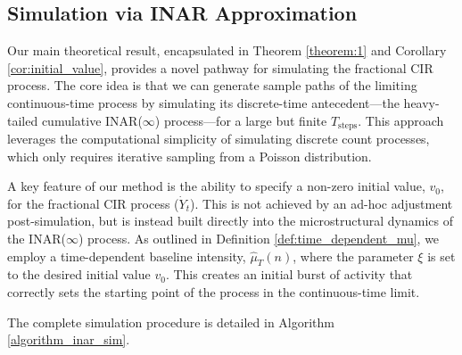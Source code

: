 \documentclass[letterpaper]{article}
\numberwithin{equation}{section}
\theoremstyle{definition}
\theoremstyle{remark}
\begin{document}
\subsection{Simulation via INAR Approximation}
\label{subsec:inar_simulation}

Our main theoretical result, encapsulated in Theorem \ref{theorem:1} and Corollary \ref{cor:initial_value}, provides a novel pathway for simulating the fractional CIR process. The core idea is that we can generate sample paths of the limiting continuous-time process by simulating its discrete-time antecedent---the heavy-tailed cumulative INAR($\infty$) process---for a large but finite $T_{\text{steps}}$. This approach leverages the computational simplicity of simulating discrete count processes, which only requires iterative sampling from a Poisson distribution.

A key feature of our method is the ability to specify a non-zero initial value, $v_0$, for the fractional CIR process ($\dot{Y}_t$). This is not achieved by an ad-hoc adjustment post-simulation, but is instead built directly into the microstructural dynamics of the INAR($\infty$) process. As outlined in Definition \ref{def:time_dependent_mu}, we employ a time-dependent baseline intensity, $\hat{\mu}_T(n)$, where the parameter $\xi$ is set to the desired initial value $v_0$. This creates an initial burst of activity that correctly sets the starting point of the process in the continuous-time limit.

The complete simulation procedure is detailed in Algorithm \ref{algorithm_inar_sim}.
\end{document}
